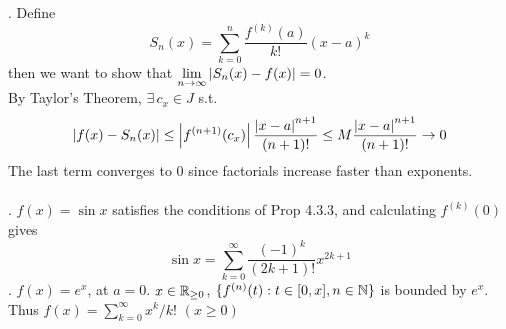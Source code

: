 \pf. Define $$S_n(x) = \sum_{k=0}^n \frac{f^{(k)}(a)}{k!}(x-a)^k$$
then we want to show that $\displaystyle \lim_{n\rightarrow\infty} \left|S_n(x) - f(x)\right| = 0$.\\
By Taylor's Theorem, $\exists\,c_x \in J$ s.t. $$\left|f(x) - S_n(x)\right| \leq \left|f^{(n+1)}(c_x)\right|\frac{\left|x-a\right|^{n+1}}{(n+1)!} \leq M \frac{\left|x-a\right|^{n+1}}{(n+1)!} \rightarrow 0$$
The last term converges to $0$ since factorials increase faster than exponents.\\
\\
\ex. $f(x) = \sin x$ satisfies the conditions of Prop 4.3.3, and calculating $f^{(k)}(0)$ gives $$\sin x = \sum_{k=0}^\infty \frac{(-1)^k}{(2k+1)!}x^{2k+1}$$
\ex. $f(x) = e^x$, at $a = 0$. $x\in \mathbb{R}_{\geq 0}$, $\{f^{(n)}(t):t\in [0, x], n\in \mathbb{N} \}$ is bounded by $e^x$. Thus $f(x) = \sum_{k =0}^\infty x^k/k!$ $ (x\geq0)$

\pagebreak